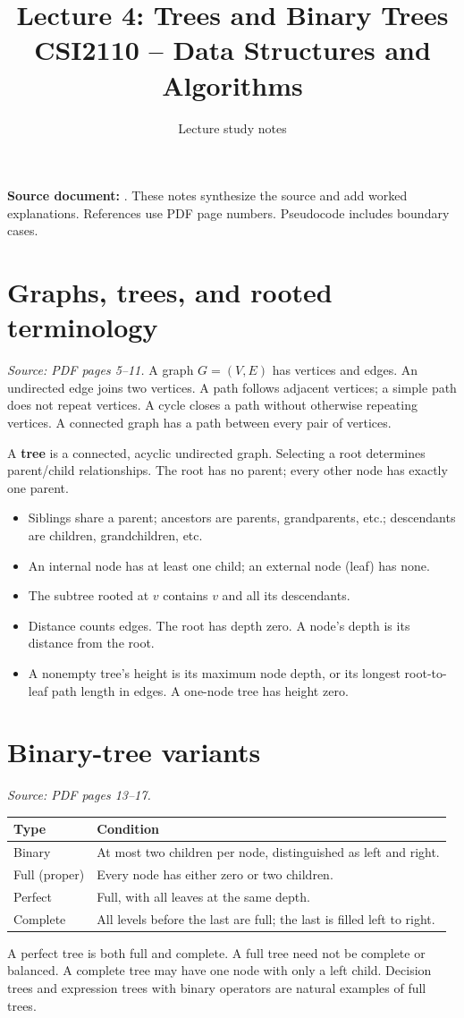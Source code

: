\documentclass[11pt,letterpaper]{article}
\title{\textbf{Lecture 4: Trees and Binary Trees}\\\large CSI2110 -- Data Structures and Algorithms}\author{Lecture study notes}\date{}
\newcommand{\sourcepages}[1]{\textit{Source: PDF pages #1.}}
\begin{document}
\maketitle
\textbf{Source document:} . These notes synthesize the source and add worked explanations. References use PDF page numbers. Pseudocode includes boundary cases.
\tableofcontents\newpage

\section{Graphs, trees, and rooted terminology}
\sourcepages{5--11}
A graph $G=(V,E)$ has vertices and edges. An undirected edge joins two vertices. A path follows adjacent vertices; a simple path does not repeat vertices. A cycle closes a path without otherwise repeating vertices. A connected graph has a path between every pair of vertices.

A \textbf{tree} is a connected, acyclic undirected graph. Selecting a root determines parent/child relationships. The root has no parent; every other node has exactly one parent.
\begin{itemize}
\item Siblings share a parent; ancestors are parents, grandparents, etc.; descendants are children, grandchildren, etc.
\item An internal node has at least one child; an external node (leaf) has none.
\item The subtree rooted at $v$ contains $v$ and all its descendants.
\item Distance counts edges. The root has depth zero. A node's depth is its distance from the root.
\item A nonempty tree's height is its maximum node depth, or its longest root-to-leaf path length in edges. A one-node tree has height zero.
\end{itemize}

\section{Binary-tree variants}
\sourcepages{13--17}
\begin{center}\begin{tabular}{@{}lp{4.8in}@{}}\toprule
Type & Condition\\\midrule
Binary & At most two children per node, distinguished as left and right.\\
Full (proper) & Every node has either zero or two children.\\
Perfect & Full, with all leaves at the same depth.\\
Complete & All levels before the last are full; the last is filled left to right.\\\bottomrule
\end{tabular}\end{center}
A perfect tree is both full and complete. A full tree need not be complete or balanced. A complete tree may have one node with only a left child. Decision trees and expression trees with binary operators are natural examples of full trees.
\end{document}
